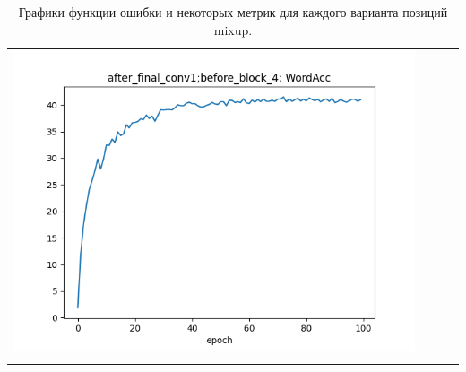 \begin{longtable}{cccc}
\includegraphics[scale=0.2]{./images/mixup_position/after_final_conv1;before_block_4_WordAcc.png}\\
\caption{Графики функции ошибки и некоторых метрик для каждого варианта позиций mixup.}
\label{tab:mixup_position}
\end{longtable}


